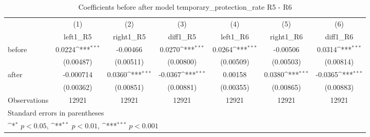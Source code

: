 \begin{table}[!ht]\centering \footnotesize
\def\sym#1{\ifmmode^{#1}\else\(^{#1}\)\fi}
\caption{Coefficients before after model temporary\_protection\_rate R5 - R6}
\begin{tabular}{l*{6}{c}}
\hline\hline
                    &\multicolumn{1}{c}{(1)}&\multicolumn{1}{c}{(2)}&\multicolumn{1}{c}{(3)}&\multicolumn{1}{c}{(4)}&\multicolumn{1}{c}{(5)}&\multicolumn{1}{c}{(6)}\\
                    &\multicolumn{1}{c}{left1\_R5}&\multicolumn{1}{c}{right1\_R5}&\multicolumn{1}{c}{diff1\_R5}&\multicolumn{1}{c}{left1\_R6}&\multicolumn{1}{c}{right1\_R6}&\multicolumn{1}{c}{diff1\_R6}\\
\hline
before              &      0.0224\sym{***}&    -0.00466         &      0.0270\sym{***}&      0.0264\sym{***}&    -0.00506         &      0.0314\sym{***}\\
                    &   (0.00487)         &   (0.00511)         &   (0.00800)         &   (0.00509)         &   (0.00503)         &   (0.00814)         \\
[1em]
after               &   -0.000714         &      0.0360\sym{***}&     -0.0367\sym{***}&     0.00158         &      0.0380\sym{***}&     -0.0365\sym{***}\\
                    &   (0.00362)         &   (0.00851)         &   (0.00881)         &   (0.00355)         &   (0.00865)         &   (0.00883)         \\
\hline
Observations        &       12921         &       12921         &       12921         &       12921         &       12921         &       12921         \\
\hline\hline
\multicolumn{7}{l}{\footnotesize Standard errors in parentheses}\\
\multicolumn{7}{l}{\footnotesize \sym{*} \(p<0.05\), \sym{**} \(p<0.01\), \sym{***} \(p<0.001\)}\\
\end{tabular}
\end{table}
